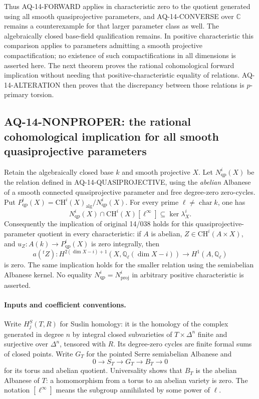 \documentclass[11pt,a4paper]{article}
\theoremstyle{definition}\newtheorem{definition}[theorem]{Definition}
\theoremstyle{remark}\newtheorem{remark}[theorem]{Remark}
\begin{document}
Thus AQ-14-FORWARD applies in characteristic zero to the
quotient generated using all smooth quasiprojective
parameters, and AQ-14-CONVERSE over $\mathbb C$ remains
a counterexample for that larger parameter class as
well. The algebraically closed base-field qualification
remains. In positive characteristic this comparison
applies to parameters admitting a smooth projective
compactification; no existence of such compactifications
in all dimensions is asserted here. The next theorem proves the
rational cohomological forward implication without needing that
positive-characteristic equality of relations. AQ-14-ALTERATION then proves that the discrepancy between those relations is $p$-primary torsion.

\subsection{AQ-14-NONPROPER: the rational cohomological implication for all smooth quasiprojective parameters}
Retain the algebraically closed base $k$ and smooth projective $X$.
Let $N^i_{\mathrm{qp}}(X)$ be the relation defined in
AQ-14-QUASIPROJECTIVE, using the \emph{abelian} Albanese of a
smooth connected quasiprojective parameter and free degree-zero
zero-cycles. Put
$P^i_{\mathrm{qp}}(X)=\mathrm{CH}^i(X)_{\mathrm{alg}}/
N^i_{\mathrm{qp}}(X)$. For every prime
$\ell\ne\operatorname{char}k$, one has
\[
 N^i_{\mathrm{qp}}(X)\cap\mathrm{CH}^i(X)[\ell^\infty]
       \subseteq\ker\lambda_X^i.                            \tag{AQ.14.2}
\]
Consequently the implication of original 14/038 holds for this
quasiprojective-parameter quotient in every characteristic:
if $A$ is abelian, $Z\in\mathrm{CH}^i(A\times X)$, and
$u_Z:A(k)\to P^i_{\mathrm{qp}}(X)$ is zero integrally, then
\[
 a({}^tZ):H^{2(\dim X-i)+1}(X,\mathbb Q_\ell(\dim X-i))
                       \longrightarrow H^1(A,\mathbb Q_\ell)
\]
is zero. The same implication holds for the smaller relation
using the semiabelian Albanese kernel. No equality
$N^i_{\mathrm{qp}}=N^i_{\mathrm{proj}}$ in arbitrary positive
characteristic is asserted.

\paragraph{Inputs and coefficient conventions.}
Write $H_j^S(T,R)$ for Suslin homology: it is the homology of
the complex generated in degree $n$ by integral closed
subvarieties of $T\times\Delta^n$ finite and surjective over
$\Delta^n$, tensored with $R$. Its degree-zero cycles are
finite formal sums of closed points. Write $G_T$ for the
pointed Serre semiabelian Albanese and
\[
 0\longrightarrow S_T\longrightarrow G_T\longrightarrow B_T
       \longrightarrow0
\]
for its torus and abelian quotient. Universality shows that
$B_T$ is the abelian Albanese of $T$: a homomorphism from a
torus to an abelian variety is zero. The notation $[\ell^\infty]$
means the subgroup annihilated by some power of $\ell$.
\end{document}
